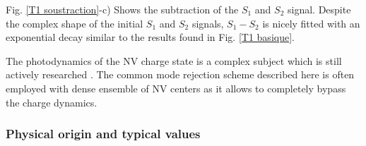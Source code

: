 \documentclass[a4paper,11pt]{report}
\begin{document}
Fig. \ref{T1 soustraction}-c) Shows the subtraction of the $S_1$ and $S_2$ signal. Despite the complex shape of the initial $S_1$ and $S_2$ signals, $S_1-S_2$ is nicely fitted with an exponential decay similar to the results found in Fig. \ref{T1 basique}.

The photodynamics of the NV charge state is a complex subject which is still actively researched \citep{craik2020microwave, gorrini2021long}. The common mode rejection scheme described  here is often employed with dense ensemble of NV centers \citep{jarmola2012temperature, mrozek2015longitudinal, choi2017depolarization} as it allows to completely bypass the charge dynamics.

\subsubsection{Physical origin and typical values}
\end{document}
